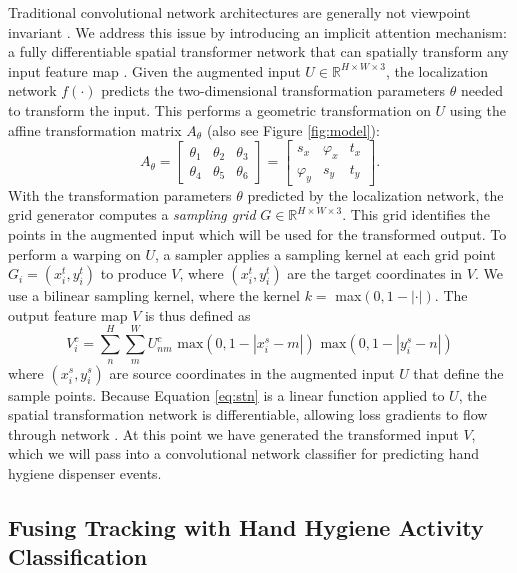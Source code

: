 \documentclass[twoside,11pt]{article}
\begin{document}
Traditional convolutional network architectures \citep{krizhevsky2012imagenet} are generally not viewpoint invariant \citep{jaderberg2015spatial}.
We address this issue by introducing an implicit attention mechanism: a fully differentiable spatial transformer network that can spatially transform any input feature map \citep{jaderberg2015spatial}.
Given the augmented input $U\in\mathbb{R}^{H\times W\times 3}$, the localization network $f(\cdot)$ predicts the two-dimensional transformation parameters $\theta$ needed to transform the input. This performs a geometric transformation on $U$ using the affine transformation matrix $A_\theta$ (also see Figure \ref{fig:model}):
\begin{equation}\label{eq:affine}
A_\theta = \begin{bmatrix}
\theta_1   &   \theta_2   &   \theta_3\\
\theta_4   &   \theta_5   &   \theta_6
\end{bmatrix}
=
\begin{bmatrix}
s_x   &   \varphi_x   &   t_x\\
\varphi_y   &   s_y   &   t_y
\end{bmatrix}
.
\end{equation}
With the transformation parameters $\theta$ predicted by the localization network, the grid generator computes a \textit{sampling grid} $G\in\mathbb{R}^{H\times W\times 3}$.
This grid identifies the points in the augmented input which will be used for the transformed output.
To perform a warping on $U$, a sampler applies a sampling kernel at each grid point $G_i=(x_i^t, y_i^t)$ to produce $V$, where $(x_i^t, y_i^t)$ are the target coordinates in $V$. We use a bilinear sampling kernel, where the kernel $k =$ max$(0, 1 - |\cdot|)$. The output feature map $V$ is thus defined as
\begin{equation}\label{eq:stn}
V_i^c = \sum_{n}^{H} \sum_{m}^{W} U_{n m}^{c} \text{ max}(0, 1 - |x_i^s - m|) \text{ max}(0, 1 - |y_i^s - n|)
\end{equation}
where $(x_i^s, y_i^s)$ are source coordinates in the augmented input $U$ that define the sample points.
Because Equation \ref{eq:stn} is a linear function applied to $U$, the spatial transformation network is differentiable, allowing loss gradients to flow through network \citep{jaderberg2015spatial}. At this point we have generated the transformed input $V$, which we will pass into a convolutional network classifier for predicting hand hygiene dispenser events.

\subsection{Fusing Tracking with Hand Hygiene Activity Classification}
\end{document}
